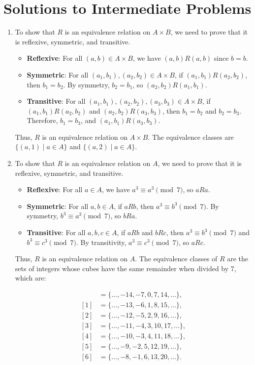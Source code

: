 
\section*{Solutions to Intermediate Problems}

\begin{enumerate}
\item
To show that $R$ is an equivalence relation on $A \times B$, we need to prove that it is reflexive, symmetric, and transitive.

\begin{itemize}
\item \textbf{Reflexive}: For all $(a, b) \in A \times B$, we have $(a, b)R(a, b)$ since $b = b$.
\item \textbf{Symmetric}: For all $(a_1, b_1), (a_2, b_2) \in A \times B$, if $(a_1, b_1)R(a_2, b_2)$, then $b_1 = b_2$. By symmetry, $b_2 = b_1$, so $(a_2, b_2)R(a_1, b_1)$.
\item \textbf{Transitive}: For all $(a_1, b_1), (a_2, b_2), (a_3, b_3) \in A \times B$, if $(a_1, b_1)R(a_2, b_2)$ and $(a_2, b_2)R(a_3, b_3)$, then $b_1 = b_2$ and $b_2 = b_3$. Therefore, $b_1 = b_3$, and $(a_1, b_1)R(a_3, b_3)$.
\end{itemize}

Thus, $R$ is an equivalence relation on $A \times B$. The equivalence classes are $\{(a, 1) \mid a \in A\}$ and $\{(a, 2) \mid a \in A\}$.

\item
To show that $R$ is an equivalence relation on $A$, we need to prove that it is reflexive, symmetric, and transitive.

\begin{itemize}
\item \textbf{Reflexive}: For all $a \in A$, we have $a^3 \equiv a^3 \pmod{7}$, so $aRa$.
\item \textbf{Symmetric}: For all $a, b \in A$, if $aRb$, then $a^3 \equiv b^3 \pmod{7}$. By symmetry, $b^3 \equiv a^3 \pmod{7}$, so $bRa$.
\item \textbf{Transitive}: For all $a, b, c \in A$, if $aRb$ and $bRc$, then $a^3 \equiv b^3 \pmod{7}$ and $b^3 \equiv c^3 \pmod{7}$. By transitivity, $a^3 \equiv c^3 \pmod{7}$, so $aRc$.
\end{itemize}

Thus, $R$ is an equivalence relation on $A$. The equivalence classes of $R$ are the sets of integers whose cubes have the same remainder when divided by 7, which are:

\begin{align*}
[0] &= \{\dots, -14, -7, 0, 7, 14, \dots\}, \\
[1] &= \{\dots, -13, -6, 1, 8, 15, \dots\}, \\
[2] &= \{\dots, -12, -5, 2, 9, 16, \dots\}, \\
[3] &= \{\dots, -11, -4, 3, 10, 17, \dots\}, \\
[4] &= \{\dots, -10, -3, 4, 11, 18, \dots\}, \\
[5] &= \{\dots, -9, -2, 5, 12, 19, \dots\}, \\
[6] &= \{\dots, -8, -1, 6, 13, 20, \dots\}.
\end{align*}


\end{enumerate}
